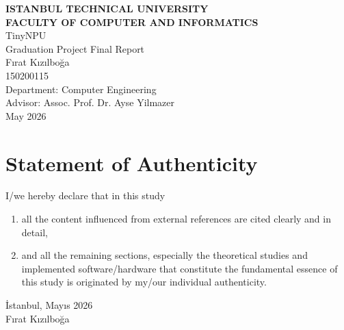 \documentclass[a4paper, 12pt, titlepage]{article}
\title{\thetitle}
\author{\theauthor}
\date{\thedate}
\newcommand{\thetitle}{TinyNPU}
\newcommand{\theauthor}{Fırat Kızılboğa}
\newcommand{\thestudentid}{150200115}
\newcommand{\thedate}{May 2026}
\newcommand{\theturkishdate}{Mayıs 2026}
\newcommand{\theadvisor}{Assoc. Prof. Dr. Ayse Yilmazer}
\begin{document}
\shorthandoff{=}


\begin{titlepage}
    \bfseries %
    \sffamily %
    \begin{center}
        \LARGE{\textbf{ISTANBUL TECHNICAL UNIVERSITY \\ 
               FACULTY OF COMPUTER AND INFORMATICS} } \\
        \vspace{5.5cm}
        \LARGE{\thetitle}  \\
        \vspace{4.5cm}
        \Large{Graduation Project Final Report} \\
        \vspace{0.5cm}
        \Large{\theauthor} \\
        \Large{\thestudentid} \\
        \vspace{4cm}
        \large{Department: Computer Engineering} \\
        \vspace{1.5cm}
        \large{Advisor: \theadvisor} \\
        \vspace{\fill} %
        \large{\normalfont \sffamily \thedate}
    \end{center}
\end{titlepage}

\newpage
\section*{Statement of Authenticity}
I/we hereby declare that in this study
\begin{enumerate}
    \item all the content influenced from external references are cited clearly and in detail,
    \item and all the remaining sections, especially the theoretical studies and implemented software/hardware that constitute the fundamental essence of this study is originated by my/our individual authenticity.
\end{enumerate}
\vspace{1em}
İstanbul, \theturkishdate
\vspace{3em}\\ \theauthor
\end{document}
